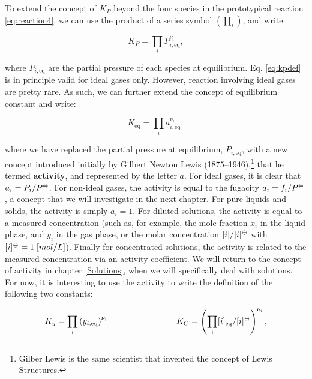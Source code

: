 \documentclass[
  9pt,
]{extbook}
\theoremstyle{definition}
\theoremstyle{definition}
\theoremstyle{definition}
\theoremstyle{remark}
\begin{document}
To extend the concept of \(K_P\) beyond the four species in the prototypical reaction \eqref{eq:reaction4}, we can use the product of a series symbol \(\left( \prod_i \right)\), and write:

\begin{equation}
K_P=\prod_i P_{i,\text{eq}}^{\nu_i},
\label{eq:kpdef}
\end{equation}

where \(P_{i,\text{eq}}\) are the partial pressure of each species at equilibrium. Eq. \eqref{eq:kpdef} is in principle valid for ideal gases only. However, reaction involving ideal gases are pretty rare. As such, we can further extend the concept of equilibrium constant and write:

\begin{equation}
K_{\text{eq}} =\prod_i a_{i,\text{eq}}^{\nu_i},
\label{eq:kdef}
\end{equation}

where we have replaced the partial pressure at equilibrium, \(P_{i,\text{eq}}\), with a new concept introduced initially by Gilbert Newton Lewis (1875--1946),\footnote{Gilber Lewis is the same scientist that invented the concept of Lewis Structures.} that he termed \textbf{activity}, and represented by the letter \(a\). For ideal gases, it is clear that \(a_i=P_i/P^{-\kern-6pt{\ominus}\kern-6pt-}\). For non-ideal gases, the activity is equal to the fugacity \(a_i=f_i/P^{-\kern-6pt{\ominus}\kern-6pt-}\), a concept that we will investigate in the next chapter. For pure liquids and solids, the activity is simply \(a_i=1\). For diluted solutions, the activity is equal to a measured concentration (such as, for example, the mole fraction \(x_i\) in the liquid phase, and \(y_i\) in the gas phase, or the molar concentration \([i]/[i]^{-\kern-6pt{\ominus}\kern-6pt-}\) with \([i]^{-\kern-6pt{\ominus}\kern-6pt-}= 1\;\text[mol/L]\)). Finally for concentrated solutions, the activity is related to the measured concentration via an activity coefficient. We will return to the concept of activity in chapter \ref{Solutions}, when we will specifically deal with solutions. For now, it is interesting to use the activity to write the definition of the following two constants:

\begin{equation}
K_y =\prod_i \left( y_{i,\text{eq}} \right)^{\nu_i} \qquad \qquad \qquad \qquad K_C =\left( \prod_i [i]_{\text{eq}}/[i]^{-\kern-6pt{\ominus}\kern-6pt-}\right)^{\nu_i},
\label{eq:kxkcdef}
\end{equation}
\end{document}
